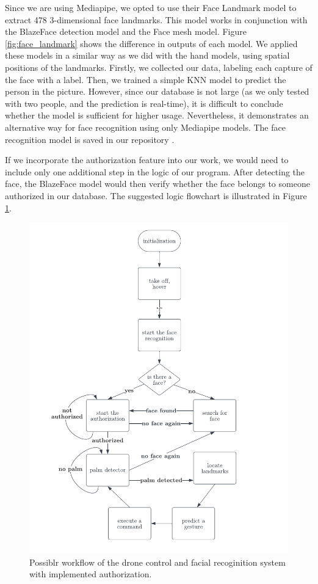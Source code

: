Since we are using Mediapipe, we opted to use their Face Landmark model to extract 478 3-dimensional face landmarks. This model works in conjunction with the BlazeFace detection model and the Face mesh model. Figure \ref{fig:face_landmark} shows the difference in outputs of each model. We applied these models in a similar way as we did with the hand models, using spatial positions of the landmarks. Firstly, we collected our data, labeling each capture of the face with a label. Then, we trained a simple KNN model to predict the person in the picture. However, since our database is not large (as we only tested with two people, and the prediction is real-time), it is difficult to conclude whether the model is sufficient for higher usage. Nevertheless, it demonstrates an alternative way for face recognition using only Mediapipe models. The face recognition model is saved in our repository \cite{touchlessdronecontrol}.





If we incorporate the authorization feature into our work, we would need to include only one additional step in the logic of our program. After detecting the face, the BlazeFace model would then verify whether the face belongs to someone authorized in our database. The suggested logic flowchart is illustrated in Figure \ref{fig:flowchart2.pdf}.


\begin{figure}[ht]
	\centering
	\includegraphics[width=\textwidth]{images/flowchart2.pdf}
	\caption{Possiblr workflow of the drone control and facial recoginition system with implemented authorization.}
	\label{fig:flowchart2.pdf}
\end{figure}

